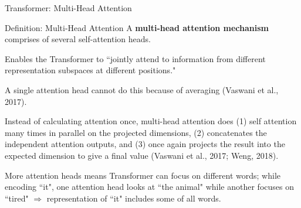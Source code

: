 \begin{frame}{Transformer: Multi-Head Attention}
    
    \begin{definitionBlock}{Definition: Multi-Head Attention}
        A \textbf{\alert{multi-head attention mechanism}} comprises of several self-attention heads. 
        
        Enables the Transformer to ``jointly attend to information from different representation subspaces at different positions." 
        
        A single attention head cannot do this because of averaging (Vaswani et al., 2017).
    \end{definitionBlock}
    
    \begin{itemizeSpaced}{4pt}
        \item Instead of calculating attention once, multi-head attention does (1) self attention many times in parallel on the projected dimensions, (2) concatenates the independent attention outputs, and (3) once again projects the result into the expected dimension to give a final value (Vaswani et al., 2017; Weng, 2018).
        
        \item More attention heads means Transformer can focus on different words; while encoding ``it", one attention head looks at ``the animal" while another focuses on ``tired" $\Rightarrow$ representation of ``it" includes some of all words. 
    \end{itemizeSpaced}
    
\end{frame}





